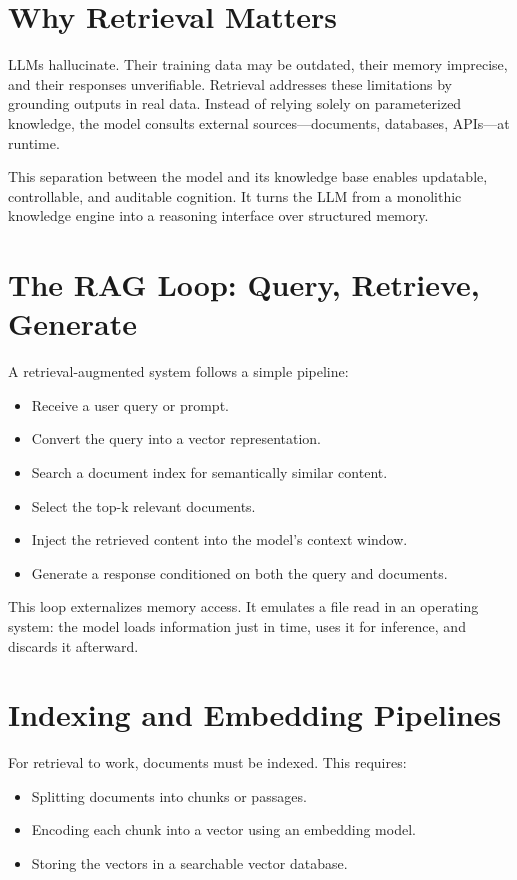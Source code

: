 \documentclass{book}
\begin{document}
\section{Why Retrieval Matters}

LLMs hallucinate. Their training data may be outdated, their memory imprecise, and their responses unverifiable. Retrieval addresses these limitations by grounding outputs in real data. Instead of relying solely on parameterized knowledge, the model consults external sources—documents, databases, APIs—at runtime.

This separation between the model and its knowledge base enables updatable, controllable, and auditable cognition. It turns the LLM from a monolithic knowledge engine into a reasoning interface over structured memory.

\section{The RAG Loop: Query, Retrieve, Generate}

A retrieval-augmented system follows a simple pipeline:

\begin{itemize}
  \item Receive a user query or prompt.
  \item Convert the query into a vector representation.
  \item Search a document index for semantically similar content.
  \item Select the top-k relevant documents.
  \item Inject the retrieved content into the model’s context window.
  \item Generate a response conditioned on both the query and documents.
\end{itemize}

This loop externalizes memory access. It emulates a file read in an operating system: the model loads information just in time, uses it for inference, and discards it afterward.

\section{Indexing and Embedding Pipelines}

For retrieval to work, documents must be indexed. This requires:

\begin{itemize}
  \item Splitting documents into chunks or passages.
  \item Encoding each chunk into a vector using an embedding model.
  \item Storing the vectors in a searchable vector database.
\end{itemize}
\end{document}
